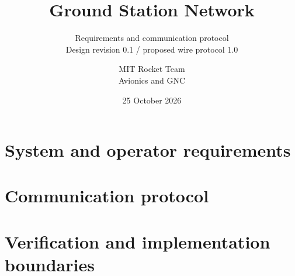 \documentclass[english,10pt,a4paper,titlepage]{scrartcl}
\title{Ground Station Network}
\subtitle{Requirements and communication protocol\\Design revision 0.1 / proposed wire protocol 1.0}
\author{MIT Rocket Team\\Avionics and GNC}
\date{25 October 2026}
\begin{document}
\maketitle

\clearpage
{\footnotesize\tableofcontents}
\clearpage
\part{System and operator requirements}

\clearpage
\part{Communication protocol}



\clearpage
\part{Verification and implementation boundaries}

\clearpage
\appendix

\clearpage

\end{document}
